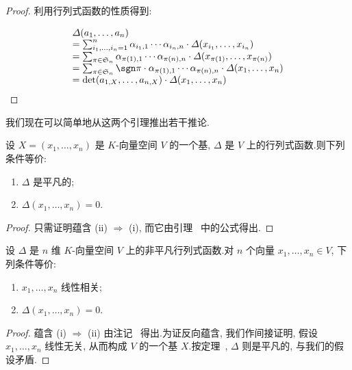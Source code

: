 \begin{proof}
利用行列式函数的性质得到:

\[
\begin{array}{l}
\varDelta(a_1, \ldots, a_n) \\
= \sum_{i_1, \ldots, i_n = 1}^{n} \alpha_{i_1, 1} \cdots \alpha_{i_n, n} \cdot \varDelta(x_{i_1}, \ldots, x_{i_n}) \\
= \sum_{\pi \in \mathfrak{S}_n} \alpha_{\pi(1), 1} \cdots \alpha_{\pi(n), n} \cdot \varDelta(x_{\pi(1)}, \ldots, x_{\pi(n)}) \\
= \sum_{\pi \in \mathfrak{S}_n} \sgn \pi \cdot \alpha_{\pi(1), 1} \cdots \alpha_{\pi(n), n} \cdot \varDelta(x_1, \ldots, x_n) \\
= \det(a_{1, X}, \ldots, a_{n, X}) \cdot \varDelta(x_1, \ldots, x_n)
\end{array}
\]
\end{proof}

我们现在可以简单地从这两个引理推出若干推论.

\begin{theorem}\label{thm:4.2.6}
设 $X = (x_1, \ldots, x_n)$ 是 $K$-向量空间 $V$ 的一个基, $\varDelta$ 是 $V$ 上的行列式函数.则下列条件等价:
\begin{enumerate}
\item[(i)] $\varDelta$ 是平凡的;
\item[(ii)] $\varDelta(x_1, \ldots, x_n) = 0$.
\end{enumerate}
\end{theorem}

\begin{proof}
只需证明蕴含 (ii) $\Longrightarrow$ (i), 而它由引理~ 中的公式得出.
\end{proof}

\begin{theorem}\label{thm:4.2.7}
设 $\varDelta$ 是 $n$ 维 $K$-向量空间 $V$ 上的非平凡行列式函数.对 $n$ 个向量 $x_1, \ldots, x_n \in V$, 下列条件等价:
\begin{enumerate}
\item[(i)] $x_1, \ldots, x_n$ 线性相关;
\item[(ii)] $\varDelta(x_1, \ldots, x_n) = 0$.
\end{enumerate}
\end{theorem}

\begin{proof}
蕴含 (i) $\Longrightarrow$ (ii) 由注记~ 得出.为证反向蕴含, 我们作间接证明, 假设 $x_1, \ldots, x_n$ 线性无关, 从而构成 $V$ 的一个基 $X$.按定理~, $\varDelta$ 则是平凡的, 与我们的假设矛盾.
\end{proof}

